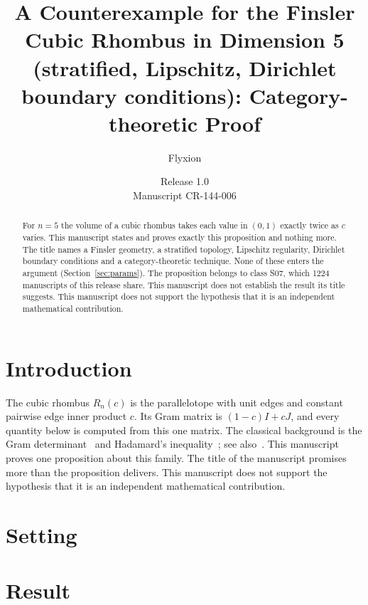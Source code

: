 \documentclass[11pt]{article}
\title{A Counterexample for the Finsler Cubic Rhombus in Dimension 5 (stratified, Lipschitz, Dirichlet boundary conditions): Category-theoretic Proof}
\author{Flyxion}
\date{Release 1.0\\ Manuscript CR-144-006}
\begin{document}
\maketitle
\begin{abstract}
For $n=5$ the volume of a cubic rhombus takes each value in $(0,1)$ exactly twice as $c$ varies. This manuscript states and proves exactly this proposition and nothing more. The title names a Finsler geometry, a stratified topology, Lipschitz regularity, Dirichlet boundary conditions and a category-theoretic technique. None of these enters the argument (Section~\ref{sec:params}). The proposition belongs to class S07, which 1224 manuscripts of this release share. This manuscript does not establish the result its title suggests. This manuscript does not support the hypothesis that it is an independent mathematical contribution.
\end{abstract}

\section{Introduction}
The cubic rhombus $R_n(c)$ is the parallelotope with unit edges and constant pairwise edge inner product $c$. Its Gram matrix is $(1-c)I+cJ$, and every quantity below is computed from this one matrix. The classical background is the Gram determinant~\cite{gram} and Hadamard's inequality~\cite{hadamard}; see also~\cite{hj}.
This manuscript proves one proposition about this family. The title of the manuscript promises more than the proposition delivers. This manuscript does not support the hypothesis that it is an independent mathematical contribution.

\section{Setting}


\section{Result}

\end{document}
